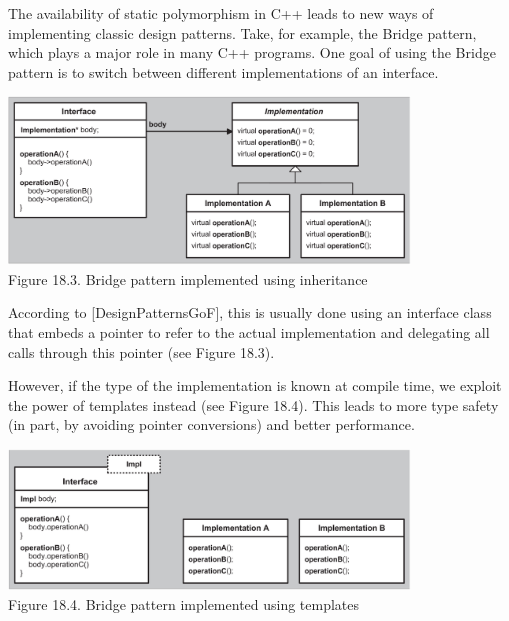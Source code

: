 The availability of static polymorphism in C++ leads to new ways of implementing classic design patterns. Take, for example, the Bridge pattern, which plays a major role in many C++ programs. One goal of using the Bridge pattern is to switch between different implementations of an interface.

\begin{center}
\includegraphics[width=0.8\textwidth]{content/3/chapter18/images/3.png} \\
Figure 18.3. Bridge pattern implemented using inheritance
\end{center}

According to [DesignPatternsGoF], this is usually done using an interface class that embeds a pointer to refer to the actual implementation and delegating all calls through this pointer (see Figure 18.3).

However, if the type of the implementation is known at compile time, we exploit the power of templates instead (see Figure 18.4). This leads to more type safety (in part, by avoiding pointer conversions) and better performance.

\begin{center}
\includegraphics[width=0.8\textwidth]{content/3/chapter18/images/4.png} \\
Figure 18.4. Bridge pattern implemented using templates
\end{center}










































